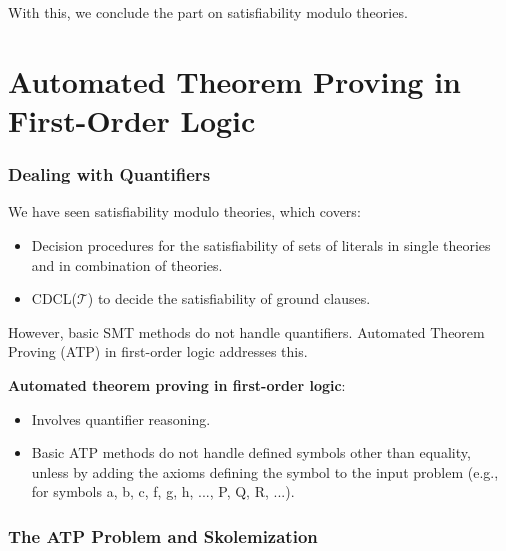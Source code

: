 \documentclass[11pt,a4paper]{article}
\theoremstyle{definition}
\theoremstyle{plain}
\theoremstyle{remark}
\begin{document}
With this, we conclude the part on satisfiability modulo theories.



\newpage



\part{Automated Theorem Proving in First-Order Logic}



\section{Dealing with Quantifiers}



We have seen satisfiability modulo theories, which covers:

\begin{itemize}

    \item Decision procedures for the satisfiability of sets of literals in single theories and in combination of theories.

    \item CDCL($\mathcal{T}$) to decide the satisfiability of ground clauses.

\end{itemize}

However, basic SMT methods do not handle quantifiers. Automated Theorem Proving (ATP) in first-order logic addresses this.



\textbf{Automated theorem proving in first-order logic}:

\begin{itemize}

    \item Involves quantifier reasoning.

    \item Basic ATP methods do not handle defined symbols other than equality, unless by adding the axioms defining the symbol to the input problem (e.g., for symbols a, b, c, f, g, h, ..., P, Q, R, ...).

\end{itemize}



\section{The ATP Problem and Skolemization}
\end{document}
